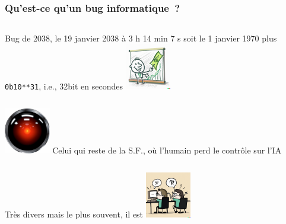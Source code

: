 \documentclass{beamer}
\begin{document}
    \begin{frame}
        \transdissolve
        \frametitle{Qu'est-ce qu'un bug informatique~?}
        \begin{columns}
            Bug de 2038, le 19 janvier 2038 à 3 h 14 min 7 s soit le 1 janvier 1970 plus \lstinline{0b10**31}, i.e., 32bit en secondes
            \centering
            \includegraphics[width=2cm]{image/bug-business}
        \end{columns}
        \begin{columns}
            \centering
            \includegraphics[width=2cm]{image/hall-eye.jpg}
            Celui qui reste de la S.F., où l'humain perd le contrôle sur l'IA
        \end{columns}
        \begin{columns}
            Très divers mais le plus souvent, il est 
            \centering
            \includegraphics[width=2cm]{image/what-are-you-coding.png}
        \end{columns}

    \end{frame}
\end{document}
